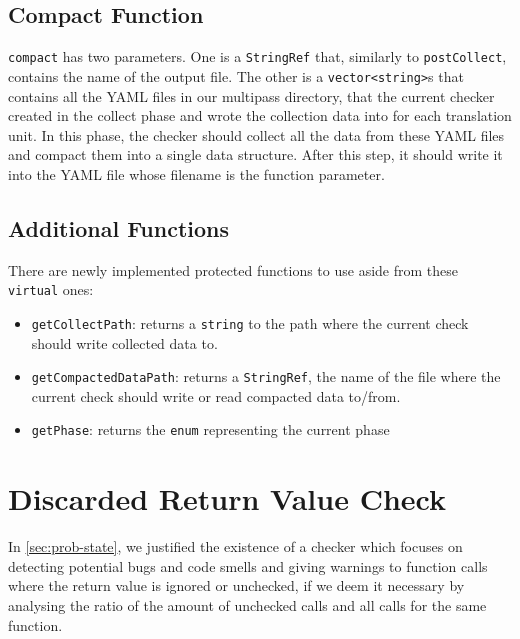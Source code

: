 \subsection{Compact Function}

\texttt{compact} has two parameters. One is a \texttt{StringRef} that, similarly to \texttt{postCollect}, contains the
name of the output file.
The other is a \texttt{vector<string>}s that contains all the YAML files in our multipass directory, that the
current checker created in the collect phase and wrote the collection data into for each translation unit.
In this phase, the checker should collect all the data from these YAML files and compact them into a single data structure. After
this step, it should write it into the YAML file whose filename is the function parameter.

\subsection{Additional Functions}

There are newly implemented protected functions to use aside from these \texttt{virtual} ones:
\begin{itemize}
  \item \texttt{getCollectPath}: returns a \texttt{string} to the path where the current check should write collected data to.
  \item \texttt{getCompactedDataPath}: returns a \texttt{StringRef}, the name of the file where the current check should write or read compacted data to/from.
  \item \texttt{getPhase}: returns the \texttt{enum} representing the current phase
\end{itemize}

\section{Discarded Return Value Check} %
\label{sec:dev-checker}

In \cref{sec:prob-state}, we justified the existence of a checker which focuses on detecting potential bugs and code smells
and giving warnings to function calls where the return value is ignored or unchecked, if we deem it necessary by analysing the ratio
of the amount of unchecked calls and all calls for the same function.

